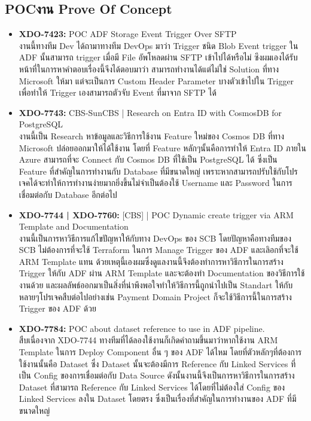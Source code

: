 \subsection{\ifenglish POC\else งาน Prove Of Concept\fi}
\begin{itemize}
      \item \textbf{XDO-7423:} POC ADF Storage Event Trigger Over SFTP\\
            งานนี้ทางทีม Dev ได้ถามาทางทีม DevOps มาว่า Trigger ชนิด Blob Event trigger ใน ADF นั้นสามารถ trigger เมื่อมี File อัพโหลดผ่าน SFTP เข้าไปได้หรือไม่ ซึงผมเองได้รับหน้าที่ในการหาคำตอบเรื่องนี้จีงได้ตอบมาว่า สามารถทำงานได้แต่ไม่ใช่ Solution ที่ทาง Microsoft ให้มา แต่จะเป็นการ Custom Header Parameter บางตัวเข้าไปใน Trigger เพื่อทำให้ Trigger เองสามารถตัวจับ Event ที่มาจาก SFTP ได้
      \item \textbf{XDO-7743:} CBS-SunCBS | Research on Entra ID with CosmosDB for PostgreSQL\\
            งานนี้เป็น Research หาข้อมูลและวิธีการใช้งาน Feature ใหม่ของ Cosmos DB ที่ทาง Microsoft ปล่อยออกมาให้ได้ใช้งาน โดยที่ Feature หลักๆนั้นคือการทำให้ Entra ID ภายใน Azure สามารถที่จะ Connect กับ Cosmos DB ที่ใช้เป็น PostgreSQL ได้ ซึ่งเป็น Feature ที่สำคัญในการทำงานกับ Database ที่มีขนาดใหญ่ เพราะหากสามารถปรับใช้กับโปรเจคได้จะทำให้การทำงานง่ายมากยิ่งขึ้นไม่จำเป็นต้องใช้ Username และ Password ในการเชื่อมต่อกับ Database อีกต่อไป
      \item \textbf{XDO-7744 | XDO-7760:} [CBS] | POC Dynamic create trigger via ARM Template and Documentation\\
            งานนี้เป็นการหาวิธีการแก้ไขปัญหาให้กับทาง DevOps ของ SCB โดยปัญหาคือทางทีมของ SCB ไม่ต้องการที่จะใช้ Terraform ในการ Manage Trigger ของ ADF และเลิอกที่จะใช้ ARM Template แทน ด้วยเหตุนี้เองผมซึ่งดูแลงานนี้จึงต้องทำการหาวิธีการในการสร้าง Trigger ให้กับ ADF ผ่าน ARM Template และจะต้องทำ Documentation ของวิธีการใช้งานด้วย และผลลัพธ์ออกมาเป็นสิ่งที่น่าพึงพอใจทำให้วิธีการนี้ถูกนำไปเป็น Standart ให้กับหลายๆโปรเจคสืบต่อไปอย่างเช่น Payment Domain Project ก็จะใช้วิธีการนี้ในการสร้าง Trigger ของ ADF ด้วย
      \item \textbf{XDO-7784:} POC about dataset reference to use in ADF pipeline.\\
            สืบเนื่องจาก XDO-7744 ทางทีมที่ได้ลองใช้งานก็เกิดคำถามขึ้นมาว่าหากใช้งาน ARM Template ในการ Deploy Component อื่น ๆ ของ ADF ได้ไหม โดยที่ตัวหลักๆที่ต้องการใช้งานนั้นคือ Dataset ซึ่ง Dataset นั้นจะต้องมีการ Reference กับ Linked Services ที่เป็น Config ของการเชื่อมต่อกับ Data Source ดังนั้นงานนี้จึงเป็นการหาวิธีการในการสร้าง Dataset ที่สามารถ Reference กับ Linked Services ได้โดยที่ไม่ต้องใส่ Config ของ Linked Services ลงใน Dataset โดยตรง ซึ่งเป็นเรื่องที่สำคัญในการทำงานของ ADF ที่มีขนาดใหญ่
\end{itemize}

